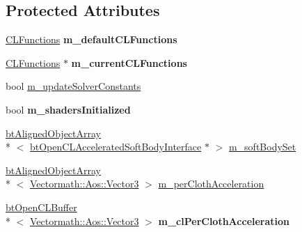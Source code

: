 \subsection*{Protected Attributes}
\begin{DoxyCompactItemize}
\item 
\hypertarget{classbt_open_c_l_soft_body_solver_aaab909130301ef8b5e16e5069f4aeb2d}{\hyperlink{class_c_l_functions}{C\+L\+Functions} {\bfseries m\+\_\+default\+C\+L\+Functions}}\label{classbt_open_c_l_soft_body_solver_aaab909130301ef8b5e16e5069f4aeb2d}

\item 
\hypertarget{classbt_open_c_l_soft_body_solver_a49ea1ce1b45814383e04db9ea711b0bc}{\hyperlink{class_c_l_functions}{C\+L\+Functions} $\ast$ {\bfseries m\+\_\+current\+C\+L\+Functions}}\label{classbt_open_c_l_soft_body_solver_a49ea1ce1b45814383e04db9ea711b0bc}

\item 
bool \hyperlink{classbt_open_c_l_soft_body_solver_a44c3d62831247081f6e79ac1c0b5fff7}{m\+\_\+update\+Solver\+Constants}
\item 
\hypertarget{classbt_open_c_l_soft_body_solver_a3d86d42b8e02bfe4229744ed58da7c79}{bool {\bfseries m\+\_\+shaders\+Initialized}}\label{classbt_open_c_l_soft_body_solver_a3d86d42b8e02bfe4229744ed58da7c79}

\item 
\hyperlink{classbt_aligned_object_array}{bt\+Aligned\+Object\+Array}\\*
$<$ \hyperlink{classbt_open_c_l_accelerated_soft_body_interface}{bt\+Open\+C\+L\+Accelerated\+Soft\+Body\+Interface} $\ast$ $>$ \hyperlink{classbt_open_c_l_soft_body_solver_a13f9eba3bc913410a703c320d2154916}{m\+\_\+soft\+Body\+Set}
\item 
\hyperlink{classbt_aligned_object_array}{bt\+Aligned\+Object\+Array}\\*
$<$ \hyperlink{class_vectormath_1_1_aos_1_1_vector3}{Vectormath\+::\+Aos\+::\+Vector3} $>$ \hyperlink{classbt_open_c_l_soft_body_solver_ac958100c16c9c92b08cf2f6066697990}{m\+\_\+per\+Cloth\+Acceleration}
\item 
\hypertarget{classbt_open_c_l_soft_body_solver_a5a0f05abb56d1f9a2f04b2b21a88b0a1}{\hyperlink{classbt_open_c_l_buffer}{bt\+Open\+C\+L\+Buffer}\\*
$<$ \hyperlink{class_vectormath_1_1_aos_1_1_vector3}{Vectormath\+::\+Aos\+::\+Vector3} $>$ {\bfseries m\+\_\+cl\+Per\+Cloth\+Acceleration}}\label{classbt_open_c_l_soft_body_solver_a5a0f05abb56d1f9a2f04b2b21a88b0a1}


\end{DoxyCompactItemize}
